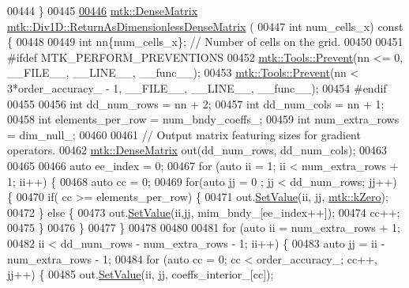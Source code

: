 \begin{DoxyCode}
{{00444 \}
00445 
\hypertarget{mtk__div__1d_8cc_source_l00446}{}\hyperlink{classmtk_1_1Div1D_af2546ad1568ef39a6075f03bb395719e}{00446} \hyperlink{classmtk_1_1DenseMatrix}{mtk::DenseMatrix} \hyperlink{classmtk_1_1Div1D_af2546ad1568ef39a6075f03bb395719e}{mtk::Div1D::ReturnAsDimensionlessDenseMatrix}
      (
00447   \textcolor{keywordtype}{int} num\_cells\_x)\textcolor{keyword}{ const }\{
00448 
00449   \textcolor{keywordtype}{int} nn\{num\_cells\_x\}; \textcolor{comment}{// Number of cells on the grid.}
00450 
00451 \textcolor{preprocessor}{  #ifdef MTK\_PERFORM\_PREVENTIONS}
00452   \hyperlink{classmtk_1_1Tools_a332324c6f25e66be9dff48c5987a3b9f}{mtk::Tools::Prevent}(nn <= 0, \_\_FILE\_\_, \_\_LINE\_\_, \_\_func\_\_);
00453   \hyperlink{classmtk_1_1Tools_a332324c6f25e66be9dff48c5987a3b9f}{mtk::Tools::Prevent}(nn < 3*order\_accuracy\_ - 1, \_\_FILE\_\_, \_\_LINE\_\_, \_\_func\_\_);
00454 \textcolor{preprocessor}{  #endif}
00455 
00456   \textcolor{keywordtype}{int} dd\_num\_rows = nn + 2;
00457   \textcolor{keywordtype}{int} dd\_num\_cols = nn + 1;
00458   \textcolor{keywordtype}{int} elements\_per\_row = num\_bndy\_coeffs\_;
00459   \textcolor{keywordtype}{int} num\_extra\_rows = dim\_null\_;
00460 
00461   \textcolor{comment}{// Output matrix featuring sizes for gradient operators.}
00462   \hyperlink{classmtk_1_1DenseMatrix}{mtk::DenseMatrix} out(dd\_num\_rows, dd\_num\_cols);
00463 
00465 
00466   \textcolor{keyword}{auto} ee\_index = 0;
00467   \textcolor{keywordflow}{for} (\textcolor{keyword}{auto} ii = 1; ii < num\_extra\_rows + 1; ii++) \{
00468     \textcolor{keyword}{auto} cc = 0;
00469     \textcolor{keywordflow}{for}(\textcolor{keyword}{auto} jj = 0 ; jj < dd\_num\_rows; jj++) \{
00470       \textcolor{keywordflow}{if}( cc >= elements\_per\_row) \{
00471         out.\hyperlink{classmtk_1_1DenseMatrix_a784ce5784109ac86bfb9d8562b334b13}{SetValue}(ii, jj, \hyperlink{group__c01-roots_ga59a451a5fae30d59649bcda274fea271}{mtk::kZero});
00472       \} \textcolor{keywordflow}{else} \{
00473         out.\hyperlink{classmtk_1_1DenseMatrix_a784ce5784109ac86bfb9d8562b334b13}{SetValue}(ii,jj, mim\_bndy\_[ee\_index++]);
00474         cc++;
00475       \}
00476     \}
00477   \}
00478 
00480 
00481   \textcolor{keywordflow}{for} (\textcolor{keyword}{auto} ii = num\_extra\_rows + 1;
00482        ii < dd\_num\_rows - num\_extra\_rows - 1; ii++) \{
00483     \textcolor{keyword}{auto} jj = ii - num\_extra\_rows - 1;
00484     \textcolor{keywordflow}{for} (\textcolor{keyword}{auto} cc = 0; cc < order\_accuracy\_; cc++, jj++) \{
00485       out.\hyperlink{classmtk_1_1DenseMatrix_a784ce5784109ac86bfb9d8562b334b13}{SetValue}(ii, jj, coeffs\_interior\_[cc]);
}}
\end{DoxyCode}
